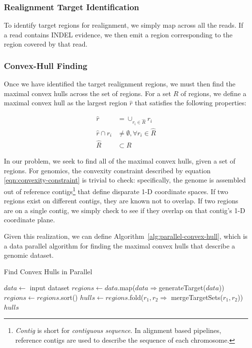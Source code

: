 \documentclass[masters]{ucbthesis}
\begin{document}
\subsubsection{Realignment Target Identification}
\label{sec:realignment-target-identification}

To identify target regions for realignment, we simply map across all the reads. If a read contains INDEL evidence,
we then emit a region corresponding to the region covered by that read.

\subsubsection{Convex-Hull Finding}
\label{sec:convex-hull}

Once we have identified the target realignment regions, we must then find the maximal convex hulls
across the set of regions. For a set $R$ of regions, we define a maximal convex hull as the largest
region $\hat{r}$ that satisfies the following properties:

\begin{align}
\label{eqn:convexity-constraint}
\hat{r} &= \cup_{r_i \in \hat{R}} r_i \\
\hat{r} \cap r_i &\ne \emptyset, \forall r_i \in \hat{R} \\
\hat{R} &\subset R
\end{align}

In our problem, we seek to find all of the maximal convex hulls, given a set of regions. For genomics, the
convexity constraint described by equation \eqref{eqn:convexity-constraint} is trivial to check: specifically, the
genome is assembled out of reference contigs\footnote{\emph{Contig} is short for \emph{contiguous
sequence}. In alignment based pipelines, reference contigs are  used to describe the sequence of each
chromosome.} that define disparate 1-D coordinate spaces. If two regions exist on different contigs, they
are known not to overlap. If two regions are on a single contig, we simply check to see if they overlap
on that contig's 1-D coordinate plane.

Given this realization, we can define Algorithm~\ref{alg:parallel-convex-hull}, which is a data parallel
algorithm for finding the maximal convex hulls that describe a genomic dataset.

\begin{algorithm}
\caption{Find Convex Hulls in Parallel}
\label{alg:parallel-convex-hull}
\begin{algorithmic}
\STATE $data \leftarrow$ input dataset
\STATE $regions \leftarrow data$.map($data \Rightarrow $generateTarget($data$))
\STATE $regions \leftarrow regions$.sort()
\STATE $hulls \leftarrow regions$.fold($r_1, r_2 \Rightarrow$ mergeTargetSets($r_1, r_2$))
\RETURN $hulls$
\end{algorithmic}
\end{algorithm}
\end{document}
